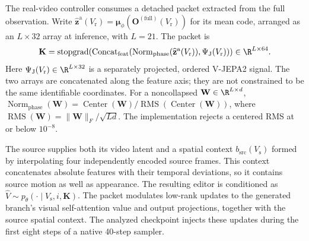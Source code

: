 The real-video controller consumes a detached packet extracted from the
full observation. Write $\widehat{\mathbf z}^{\mathrm a}(V_{\mathrm r})=\boldsymbol\mu_\phi(\mathbf O^{(\mathrm{full})}(V_{\mathrm r}))$
for its mean code, arranged as an $L\times32$ array at inference, with $L=21$.
The packet is
\begin{equation}
 \mathbf K=\operatorname{stopgrad}\!\left(
   \operatorname{Concat}_{\mathrm{feat}}\!\left(
    \operatorname{Norm}_{\mathrm{phase}}(\widehat{\mathbf z}^{\mathrm a}(V_{\mathrm r})),
    \Psi_{\mathrm J}(V_{\mathrm r})\right)\right)
 \in\R^{L\times64}.
 \label{eq:impl-action-packet}
\end{equation}
Here $\Psi_{\mathrm J}(V_{\mathrm r})\in\R^{L\times32}$ is a separately projected,
ordered V-JEPA2 signal. The two arrays are concatenated along the feature
axis; they are not constrained to be the same identifiable coordinates.
For a noncollapsed $\mathbf W\in\R^{L\times d}$,
$\operatorname{Norm}_{\mathrm{phase}}(\mathbf W)=\operatorname{Center}(\mathbf W)/
\operatorname{RMS}(\operatorname{Center}(\mathbf W))$, where
$\operatorname{RMS}(\mathbf W)=\|\mathbf W\|_F/\sqrt{Ld}$.
The implementation rejects a centered RMS at or below $10^{-8}$.

The source supplies both its video latent and a spatial context
$b_{\mathrm{src}}(V_{\mathrm s})$ formed by interpolating four independently encoded
source frames. This context concatenates absolute features with their
temporal deviations, so it contains source motion as well as appearance.
The resulting editor is conditioned as
$\widehat V\sim p_\theta(\cdot\mid V_{\mathrm s},i,\mathbf K)$.
The packet modulates low-rank updates to the generated branch's
visual self-attention value and output projections, together with
the source spatial context. The analyzed checkpoint injects these
updates during the first eight steps of a native 40-step sampler.

